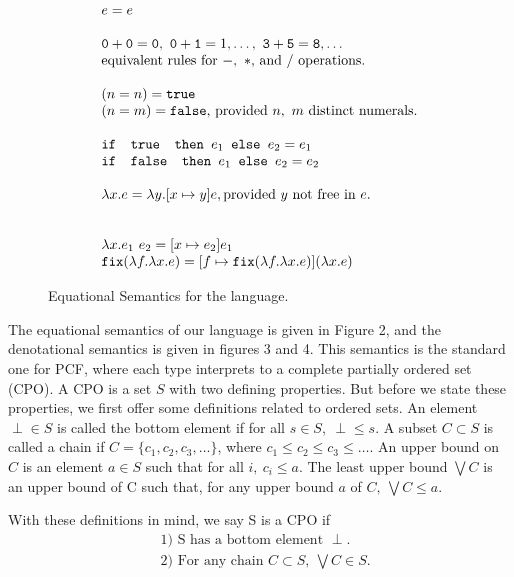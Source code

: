 \begin{figure}
\[
\begin{array}{lr}
e = e \\ \\
\texttt{0} + \texttt{0} = \texttt{0}, \ \texttt{0} + \texttt{1} = 1, \ldots, \ \texttt{3} + \texttt{5} = \texttt{8}, \ldots  \\
\text{equivalent rules for } -, \ * \text{, and } /\text{ operations.}
\\ \\
(n =n) = \texttt{true} \\ (n=m) = \texttt{false}\text{, provided } n, \ m \text{ distinct numerals.}\\ \\ 
\ifelse{\texttt{ true }}{e_1}{e_2} = e_1 \\
\ifelse{\texttt{ false }}{e_1}{e_2} = e_2 \\ \\ 
\lambda x.e = \lambda y.[x \mapsto y]e, \text{provided } y \text{ not free in } e. \\ \\ \\
\lambda x.e_1 \ e_2 = [x \mapsto e_2]e_1 \\
\texttt{fix}(\lambda f. \lambda x.e) = [f \mapsto \texttt{fix}(\lambda f.\lambda x.e)](\lambda x.e)
\end{array}
\]
\caption{Equational Semantics for the language.}
\label{fig:typing}
\end{figure}

The equational semantics of our language is given in Figure 2, and the denotational semantics is given in figures 3 and 4.
This semantics is the standard one for PCF, where each type interprets to a complete
partially ordered set (CPO). A CPO is a set $S$ with two defining properties. But before we state these properties,
we first offer some definitions related to ordered sets. An element $\perp \in S$ is called the bottom element if for all
$s \in S, \ \perp \leq s$. A subset $C \subset S$ is called a chain if $C = \{c_1, c_2, c_3, \dots\}$, where 
$c_1 \leq c_2 \leq c_3 \leq \dots$. An upper bound on $C$ is an element $a \in S$ such that for all $i, \ c_i \leq a$. 
The least upper bound $\bigvee C$ is an upper bound of C such that, for any upper bound $a$ of $C, \ \bigvee C \leq a$.

With these definitions in mind, we say S is a CPO if
\begin{align*}
&\text{1) S has a bottom element }\perp.\\
&\text{2) For any chain }C \subset S, \ \bigvee C \in S. \\
\end{align*}

